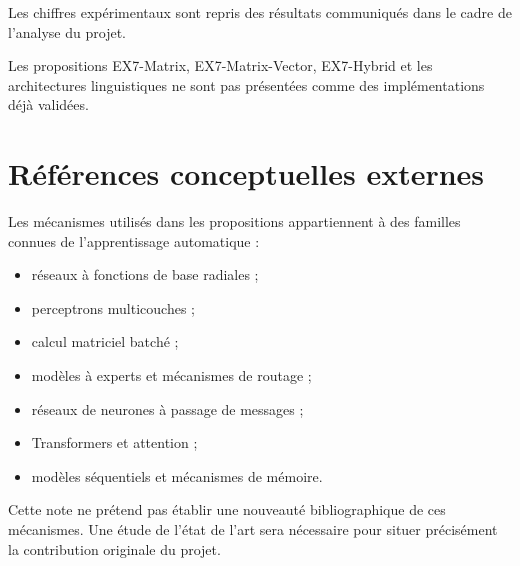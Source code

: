 \documentclass[11pt,a4paper]{report}
\begin{document}
Les chiffres expérimentaux sont repris des résultats
communiqués dans le cadre de l'analyse du projet.

Les propositions EX7-Matrix, EX7-Matrix-Vector,
EX7-Hybrid et les architectures linguistiques ne sont
pas présentées comme des implémentations déjà validées.

\section{Références conceptuelles externes}

Les mécanismes utilisés dans les propositions appartiennent
à des familles connues de l'apprentissage automatique :

\begin{itemize}
  \item réseaux à fonctions de base radiales ;
  \item perceptrons multicouches ;
  \item calcul matriciel batché ;
  \item modèles à experts et mécanismes de routage ;
  \item réseaux de neurones à passage de messages ;
  \item Transformers et attention ;
  \item modèles séquentiels et mécanismes de mémoire.
\end{itemize}

Cette note ne prétend pas établir une nouveauté
bibliographique de ces mécanismes. Une étude de l'état
de l'art sera nécessaire pour situer précisément
la contribution originale du projet.
\end{document}
